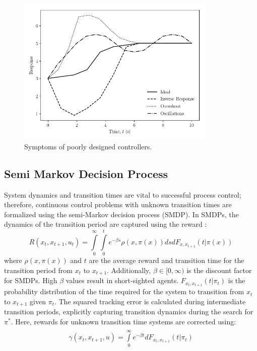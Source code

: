 \begin{figure}[h]
    \begin{center}
        \includegraphics[width=9.5cm]{images/ftc/inv_overshoot_pid.png}
        \caption{\label{fig:inv_overshoot_pid} Symptoms of poorly designed controllers.}
    \end{center}
\end{figure}

\subsection{Semi Markov Decision Process}
System dynamics and transition times are vital to successful process control; therefore, continuous control problems with unknown transition times are formalized using the semi-Markov decision process (SMDP). In SMDPs, the dynamics of the transition period are captured using the reward \cite{continuous_rl_ref14}:
\begin{equation}
R(x_t, x_{t+1}, u_t) = \int\limits^\infty_0 \int\limits^t_0 e^{-\beta s} \rho(x, \pi (x))dsdF_{x, x_{t+1}}(t | \pi (x))
\label{eq:reward_rate}
\end{equation}
where $\rho(x, \pi (x))$ and $t$ are the average reward and transition time for the transition period from $x_t$ to $x_{t+1}$. Additionally, $\beta \in [0, \infty)$ is the discount factor for SMDPs.  High $\beta$ values result in short-sighted agents. $F_{x_t, x_{t+1}}(t | \pi_t)$ is the probability distribution of the time required for the system to transition from $x_t$ to $x_{t+1}$ given $\pi_t$.  The squared tracking error is calculated during intermediate transition periods, explicitly capturing transition dynamics during the search for $\pi^*$. Here, rewards for unknown transition time systems are corrected using:
\begin{eqnarray}
\begin{array}{rcl}
\gamma(x_t, x_{t+1}, u) = \int\limits^{\infty}_0 e^{-\beta t} dF_{x_t, x_{t+1}}(t | \pi_t)
\end{array}
\label{eq:discount_factor}
\end{eqnarray}

